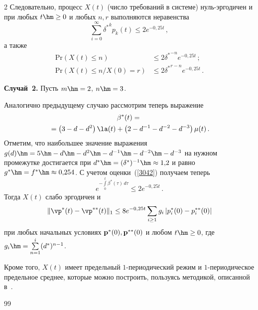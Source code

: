 \begin{multicols}{2}
Следовательно, процесс $X(t)$ (число требований в системе) нуль-эр\-го\-ди\-чен 
и при любых $t \hm\ge 0$ и любых $n, r$
выполняются неравенства
\begin{equation*}
\sum\limits_{i=0}^{\infty} {\delta^*}^k p_k (t) \le
2e^{-0{,}25 t}\,,  
\end{equation*}
а также
\begin{align*}
\mathrm{Pr} \left(X(t)  \le n \right) &\le 2{\delta^*}^{-n}e^{-0{,}25 t}\,;\\
\mathrm{Pr} \left(X(t)  \le n / X(0) = r \right) &\le 2{\delta^*}^{r-n}e^{-0{,}25 t}\,.
\end{align*}


{\bf Случай~2.} Пусть $m \hm= 2$, $n\hm=3$.

Аналогично предыдущему случаю рассмотрим теперь выражение
\begin{multline*}
\beta^*(t) =  {}\\
{}=\left(3  -d -d^2\right)\la(t)  + \left(2 -d^{-1} -d^{-2} - d^{-3}\right)\mu(t)\,.
\end{multline*}
Отметим, что наибольшее значение выражения 
$g(d)\hm=5\hm-d \hm- d^2 \hm- d^{-1} \hm- d^{-2} \hm- d^{-3}$
на нужном промежутке достигается при $d^* \hm= (\delta^*)^{-1}\hm \approx 1{,}2$ 
и равно $g^* \hm= f^* \hm\approx 0{,}254$.
С учетом оценки~(\ref{3042}) получаем теперь
\begin{equation*}
e^{-\int\limits_0^t\beta^*(\tau)\,d\tau} \le 2 e^{- 0{,}25 t}\,.
\end{equation*}
Тогда  $X\left( t\right) $ слабо эргодичен  и
\begin{equation*}
\|\vp^*(t)-\vp^{**}(t)\|_{1} \le 8 e^{-0{,}25 t} 
\sum\limits_{i \ge 1} g_i\left|p_i^*(0)-p_i^{**}(0)\right| 
\end{equation*}
при любых начальных условиях ${\bf p^*}(0), {\bf p^{**}}(0)$ и 
любом $t \hm\ge 0$, где $g_i\hm=\sum\limits_{n=1}^{i}(d^*)^{n-1}$.

Кроме того, $X\left( t\right) $ имеет предельный $1$-пе\-рио\-ди\-че\-ский режим и 
$1$-пе\-рио\-ди\-че\-ское предельное среднее, которые можно построить, пользуясь 
методикой, описанной в~\cite{z12, z06}.

{\small\frenchspacing
{%
\begin{thebibliography}{99}




\end{thebibliography}}}
\end{multicols}
